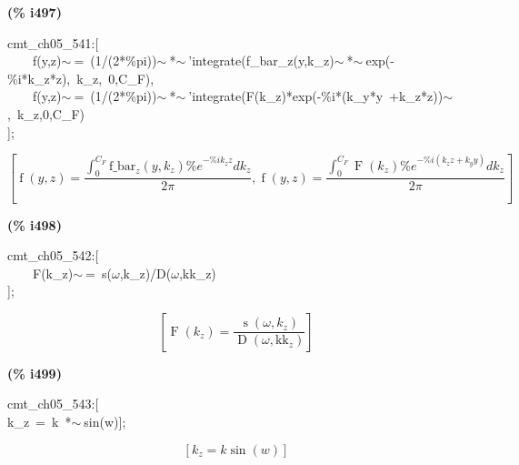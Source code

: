 \documentclass[fleqn]{article}
\begin{document}
\noindent
\begin{minipage}[t]{4.000000em}\color{red}\bfseries
(\% i497)	
\end{minipage}
\begin{minipage}[t]{\textwidth}\color{blue}
cmt\_ch05\_541:[\\
\ \ \ \ f(y,z)\ensuremath{\sim\ }=\ (1/(2*\%pi))\ensuremath{\sim\ }*\ensuremath{\sim\ }'integrate(f\_bar\_z(y,k\_z)\ensuremath{\sim\ }*\ensuremath{\sim\ }exp(-\%i*k\_z*z),\ k\_z,\ 0,C\_F),\\
\ \ \ \ f(y,z)\ensuremath{\sim\ }=\ (1/(2*\%pi))\ensuremath{\sim\ }*\ensuremath{\sim\ }'integrate(F(k\_z)*exp(-\%i*(k\_y*y\ +k\_z*z))\ensuremath{\sim\ },\ k\_z,0,C\_F)\\
];
\end{minipage}
\[\displaystyle \tag{\% o497} 
\operatorname{[}\operatorname{f}\left( y\operatorname{,}z\right) =\frac{\int_{0}^{{C_F}}{\left. {{\ensuremath{\mathrm{f\_ bar}}}_z}\left( y\operatorname{,}{k_z}\right)  {{\% e}^{-\% i {k_z} z}}d{k_z}\right.}}{2 \ensuremath{\pi} }\operatorname{,}\operatorname{f}\left( y\operatorname{,}z\right) =\frac{\int_{0}^{{C_F}}{\left. \operatorname{F}\left( {k_z}\right)  {{\% e}^{-\% i \left( {k_z} z+{k_y} y\right) }}d{k_z}\right.}}{2 \ensuremath{\pi} }\operatorname{]}\mbox{}
\]


\noindent
\begin{minipage}[t]{4.000000em}\color{red}\bfseries
(\% i498)	
\end{minipage}
\begin{minipage}[t]{\textwidth}\color{blue}
cmt\_ch05\_542:[\\
\ \ \ \ F(k\_z)\ensuremath{\sim\ }=\ s(\ensuremath{\omega},k\_z)/D(\ensuremath{\omega},kk\_z)\\
];
\end{minipage}
\[\displaystyle \tag{\% o498} 
\left[ \operatorname{F}\left( {k_z}\right) =\frac{\operatorname{s}\left( \omega \operatorname{,}{k_z}\right) }{\operatorname{D}\left( \omega \operatorname{,}{{\ensuremath{\mathrm{kk}}}_z}\right) }\right] \mbox{}
\]


\noindent
\begin{minipage}[t]{4.000000em}\color{red}\bfseries
(\% i499)	
\end{minipage}
\begin{minipage}[t]{\textwidth}\color{blue}
cmt\_ch05\_543:[\\
k\_z\ =\ k\ *\ensuremath{\sim\ }sin(w)];
\end{minipage}
\[\displaystyle \tag{\% o499} 
\left[ {k_z}=k \sin{(w)}\right] \mbox{}
\]
\end{document}
